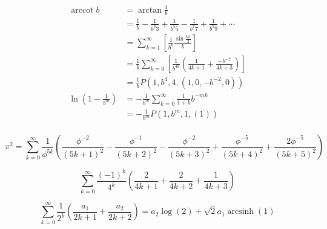 $$\begin{aligned}
\operatorname{arccot}b&=\arctan{\frac{1}{b}}\\
&=\frac{1}{b}-\frac{1}{b^{3}3}+\frac{1}{b^{5}5}-\frac{1}{b^{7}7}+\frac{1}{b^{9}9}+\cdots\\
&=\sum_{k=1}^{\infty}\left[\frac{1}{b^{k}}\frac{\sin{\frac{k\pi}{2}}}{k}\right]\\
&=\frac{1}{b}\sum_{k=0}^{\infty}\left[\frac{1}{b^{4k}}\left(\frac{1}{4k+1}+\frac{-b^{-2}}{4k+3}\right)\right]\\
&=\frac{1}{b}P\left(1,b^{4},4,(1,0,-b^{-2},0)\right)\\
\ln\left(1-\frac{1}{b^m}\right)&=-\frac{1}{b^m}\sum\limits_{k=0}^\infty{\frac{1}{1+k}{b^{-mk}}}\\
&=-\frac{1}{b^m}P(1,b^m,1,(1))\\
\end{aligned}$$

$$\pi^2=\sum\limits_{k=0}^\infty{\frac{1}{\phi^{5k}}\left(\frac{\phi^{-2}}{\left(5k+1\right)^2}-\frac{\phi^{-1}}{\left(5k+2\right)^2}-\frac{\phi^{-2}}{\left(5k+3\right)^2}+\frac{\phi^{-5}}{\left(5k+4\right)^2}+\frac{2\phi^{-5}}{\left(5k+5\right)^2}\right)}$$

$$\sum\limits_{k=0}^\infty{\frac{(-1)^k}{4^k}\left(\frac{2}{4k+1}+\frac{2}{4k+2}+\frac{1}{4k+3}\right)}$$

$$\sum_{k=0}^\infty{\frac{1}{2^k}\left(\frac{a_1}{2k+1}+\frac{a_2}{2k+2}\right)}=a_2\log(2)+\sqrt2a_1\operatorname{arcsinh}(1)$$



